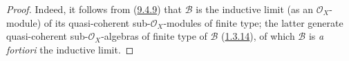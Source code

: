 \begin{proof}
Indeed, it follows from (\hyperref[I.9.4.9]{9.4.9}) that $\mathscr{B}$
is the inductive limit (as an $\mathscr{O}_X$-module) of its quasi-coherent
sub-$\mathscr{O}_X$-modules of finite type; the latter generate
quasi-coherent sub-$\mathscr{O}_X$-algebras of finite type of $\mathscr{B}$
(\hyperref[I.1.3.14]{1.3.14}), of which $\mathscr{B}$ is \emph{a
fortiori} the inductive limit.
\end{proof}
